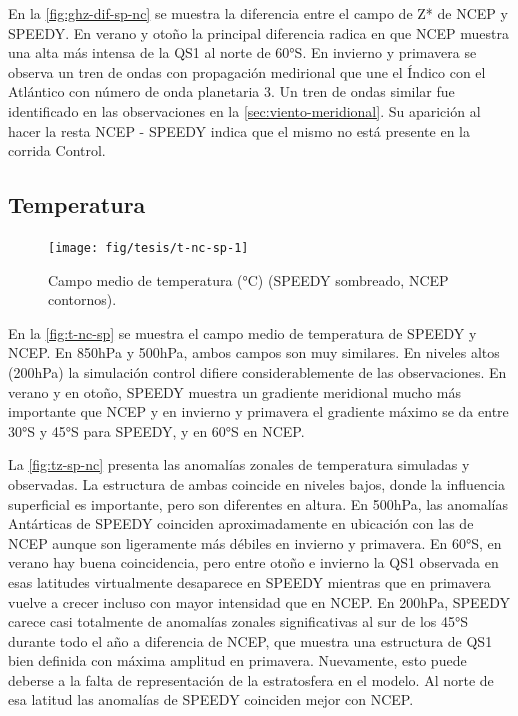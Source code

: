 \documentclass[spanish,a4paper,12pt,oneside]{book}
\begin{document}
En la \autoref{fig:ghz-dif-sp-nc} se muestra la diferencia entre el
campo de Z* de NCEP y SPEEDY. En verano y otoño la principal diferencia
radica en que NCEP muestra una alta más intensa de la QS1 al norte de
60°S. En invierno y primavera se observa un tren de ondas con
propagación medirional que une el Índico con el Atlántico con número de
onda planetaria 3. Un tren de ondas similar fue identificado en las
observaciones en la \autoref{sec:viento-meridional}. Su aparición al
hacer la resta NCEP - SPEEDY indica que el mismo no está presente en la
corrida Control.

\subsection{Temperatura}\label{temperatura-1}

\begin{landscape}\begin{figure}

{\centering \texttt{[image: fig/tesis/t-nc-sp-1]} 

}

\caption{Campo medio de temperatura (°C) (SPEEDY sombreado, NCEP contornos).}\label{fig:t-nc-sp}
\end{figure}
\end{landscape}

En la \autoref{fig:t-nc-sp} se muestra el campo medio de temperatura de
SPEEDY y NCEP. En 850hPa y 500hPa, ambos campos son muy similares. En
niveles altos (200hPa) la simulación control difiere considerablemente
de las observaciones. En verano y en otoño, SPEEDY muestra un gradiente
meridional mucho más importante que NCEP y en invierno y primavera el
gradiente máximo se da entre 30°S y 45°S para SPEEDY, y en 60°S en NCEP.

La \autoref{fig:tz-sp-nc} presenta las anomalías zonales de temperatura
simuladas y observadas. La estructura de ambas coincide en niveles
bajos, donde la influencia superficial es importante, pero son
diferentes en altura. En 500hPa, las anomalías Antárticas de SPEEDY
coinciden aproximadamente en ubicación con las de NCEP aunque son
ligeramente más débiles en invierno y primavera. En 60°S, en verano hay
buena coincidencia, pero entre otoño e invierno la QS1 observada en esas
latitudes virtualmente desaparece en SPEEDY mientras que en primavera
vuelve a crecer incluso con mayor intensidad que en NCEP. En 200hPa,
SPEEDY carece casi totalmente de anomalías zonales significativas al sur
de los 45°S durante todo el año a diferencia de NCEP, que muestra una
estructura de QS1 bien definida con máxima amplitud en primavera.
Nuevamente, esto puede deberse a la falta de representación de la
estratosfera en el modelo. Al norte de esa latitud las anomalías de
SPEEDY coinciden mejor con NCEP.
\end{document}
